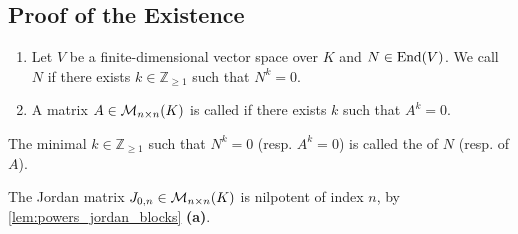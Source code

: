 \subsection{Proof of the Existence}

\begin{definition}
\label{def:nilpotent}
\begin{enumerate}[label=\textbf{(\alph*)}]
    \item Let $V$ be a finite-di\-men\-sional vector space over $K$ and $N \in \operatorname{End}(V)$. We call $N$  if there exists $k \in \mathbb{Z}_{\ge 1}$ such that $N^k = 0$.
    \item A matrix $A \in \mathcal{M}_{n \times n}(K)$ is called  if there exists $k$ such that $A^k = 0$.
\end{enumerate}
The minimal $k \in \mathbb{Z}_{\ge 1}$ such that $N^k = 0$ (resp. $A^k = 0$) is called the  of $N$ (resp. of $A$).
\end{definition}

\begin{example}
The Jordan matrix $J_{0,n} \in \mathcal{M}_{n \times n}(K)$ is nilpotent of index $n$, by \cref{lem:powers_jordan_blocks} \textbf{(a)}.
\end{example}

